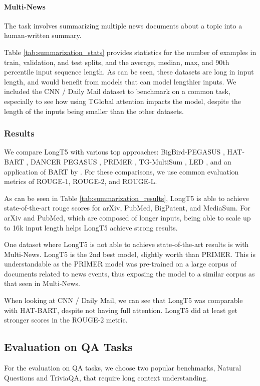 \documentclass[11pt]{article}
\begin{document}
\paragraph{Multi-News} \cite{fabbri-etal-2019-multi} The task involves summarizing multiple news documents about a topic into a human-written summary.

Table \ref{tab:summarization_stats} provides statistics for the number of examples in train, validation, and test splits, and the average, median, max, and 90th percentile input sequence length.
As can be seen, these datasets are long in input length, and would benefit from models that can model lengthier inputs.
We included the CNN / Daily Mail dataset to benchmark on a common task, especially to see how using TGlobal attention impacts the model, despite the length of the inputs being smaller than the other datasets.


\subsubsection{Results}
 
We compare LongT5 with various top approaches: BigBird-PEGASUS \cite{zaheer2020}, HAT-BART \cite{rohde2021hierarchical}, DANCER PEGASUS \cite{gidiotis2020}, PRIMER \cite{xiao2021primer}, TG-MultiSum \cite{cui2021topicguided}, LED \cite{Beltagy2020Longformer}, and an application of BART by . For these comparisons, we use common evaluation metrics of ROUGE-1, ROUGE-2, and ROUGE-L.

As can be seen in Table \ref{tab:summarization_results}, LongT5 is able to achieve state-of-the-art rouge scores for arXiv, PubMed, BigPatent, and MediaSum.
For arXiv and PubMed, which are composed of longer inputs, being able to scale up to 16k input length helps LongT5 achieve strong results.

One dataset where LongT5 is not able to achieve state-of-the-art results is with Multi-News.
LongT5 is the 2nd best model, slightly worth than PRIMER.
This is understandable as the PRIMER model was pre-trained on a large corpus of documents related to news events, thus exposing the model to a similar corpus as that seen in Multi-News.

When looking at CNN / Daily Mail, we can see that LongT5 was comparable with HAT-BART, despite not having full attention.
LongT5 did at least get stronger scores in the ROUGE-2 metric.

\subsection{Evaluation on QA Tasks}
For the evaluation on QA tasks, we choose two popular benchmarks, Natural Questions and TriviaQA, that require long context understanding.  
\end{document}
